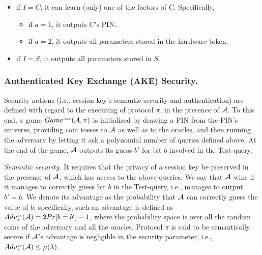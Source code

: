 \begin{itemize}
\begin{itemize}

\item if $I=C$:  it can learn (only) one of the factors of $C$. Specifically, 
%



\begin{itemize}
\item if $a=1$, it outputs $C$'s PIN. 



\item if  $a=2$, it outputs all parameters stored in the hardware token. 
  \end{itemize}
  
  
  
\item if $I=S$, it outputs all parameters stored in $S$. 
\end{itemize}
\end{itemize}

\subsubsection{Authenticated Key Exchange (AKE)  Security.} Security notions (i.e., session key's semantic security and authentication) are defined with regard to the executing of protocol $\pi$, in the presence of   $\mathcal{A}$. To this end, a game $Game^{\scriptscriptstyle ake} (\mathcal{A},\pi)$ is initialized by drawing a PIN  from the PIN's universe,
providing coin tosses to $\mathcal{A}$ as well as to the oracles, and then running the adversary by letting it ask a polynomial
number of queries defined above. At the end of the game, $\mathcal{A}$  outputs its guess $b'$ for  bit $b$
involved in the Test-query. 



\noindent\textit{Semantic security.} It requires that the privacy of a session key be preserved in the presence of $\mathcal{A}$, which has access to the above queries. We say that $\mathcal{A}$  wins if it manages to correctly guess bit $b$ in the Test-query, i.e., manages to output $b'=b$. We denote its advantage as the probability that $\mathcal{A}$  can correctly guess the value of $b$; specifically, such an advantage is defined as $Adv_{\scriptscriptstyle\pi}^{\scriptscriptstyle ss}(\mathcal{A})=2Pr[b=b']-1$, where the probability space is over all the random coins of the adversary and all the oracles.  Protocol $\pi$ is said to be semantically secure if $\mathcal{A}$'s advantage is negligible in the security parameter, i.e., $Adv_{\scriptscriptstyle\pi}^{\scriptscriptstyle ss}(\mathcal{A})\leq \mu(\lambda)$.


